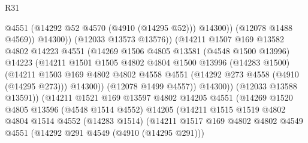 \begin{lexlean}{R31}
\begin{coremodule}
                                      @4551
                                      (@14292 @52 @4570 (@4910 (@14295 @52)))
                                      @14300))
                                  (@12078 @1488 @4569))
                                @14300))
                            (@12033 @13573 @13576))
                          (@14211
                            @1507
                            @169
                            @13582
                            @4802
                            @14223
                            @4551
                            (@14269
                              @1506
                              @4805
                              @13581
                              (@4548 @1500 @13996)
                              @14223
                              (@14211
                                @1501
                                @1505
                                @4802
                                @4804
                                @1500
                                @13996
                                (@14283 @1500)
                                (@14211
                                  @1503
                                  @169
                                  @4802
                                  @4802
                                  @4558
                                  @4551
                                  (@14292 @273 @4558 (@4910 (@14295 @273)))
                                  @14300))
                              (@12078 @1499 @4557))
                            @14300))
                        (@12033 @13588 @13591))
                      (@14211
                        @1521
                        @169
                        @13597
                        @4802
                        @14205
                        @4551
                        (@14269
                          @1520
                          @4805
                          @13596
                          (@4548 @1514 @4552)
                          @14205
                          (@14211
                            @1515
                            @1519
                            @4802
                            @4804
                            @1514
                            @4552
                            (@14283 @1514)
                            (@14211
                              @1517
                              @169
                              @4802
                              @4802
                              @4549
                              @4551
                              (@14292 @291 @4549 (@4910 (@14295 @291)))

\end{coremodule}
\end{lexlean}
